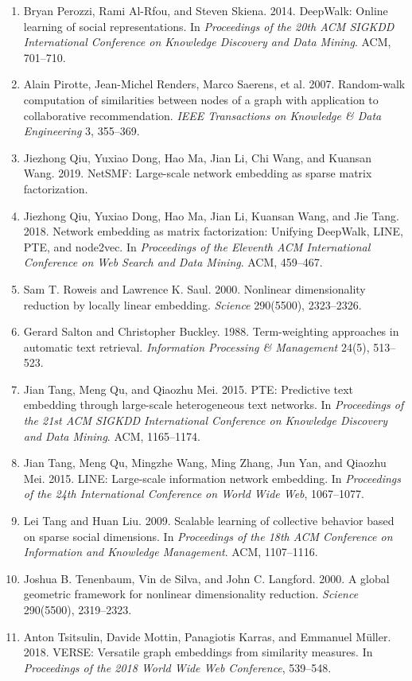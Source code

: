\documentclass[11pt]{article}
\begin{document}
\begin{enumerate}[leftmargin=1.5em]
    \item Bryan Perozzi, Rami Al-Rfou, and Steven Skiena. 2014. DeepWalk: Online learning of social representations. In \emph{Proceedings of the 20th ACM SIGKDD International Conference on Knowledge Discovery and Data Mining}. ACM, 701--710.
    \item Alain Pirotte, Jean-Michel Renders, Marco Saerens, et al. 2007. Random-walk computation of similarities between nodes of a graph with application to collaborative recommendation. \emph{IEEE Transactions on Knowledge \& Data Engineering} 3, 355--369.
    \item Jiezhong Qiu, Yuxiao Dong, Hao Ma, Jian Li, Chi Wang, and Kuansan Wang. 2019. NetSMF: Large-scale network embedding as sparse matrix factorization.
    \item Jiezhong Qiu, Yuxiao Dong, Hao Ma, Jian Li, Kuansan Wang, and Jie Tang. 2018. Network embedding as matrix factorization: Unifying DeepWalk, LINE, PTE, and node2vec. In \emph{Proceedings of the Eleventh ACM International Conference on Web Search and Data Mining}. ACM, 459--467.
    \item Sam T. Roweis and Lawrence K. Saul. 2000. Nonlinear dimensionality reduction by locally linear embedding. \emph{Science} 290(5500), 2323--2326.
    \item Gerard Salton and Christopher Buckley. 1988. Term-weighting approaches in automatic text retrieval. \emph{Information Processing \& Management} 24(5), 513--523.
    \item Jian Tang, Meng Qu, and Qiaozhu Mei. 2015. PTE: Predictive text embedding through large-scale heterogeneous text networks. In \emph{Proceedings of the 21st ACM SIGKDD International Conference on Knowledge Discovery and Data Mining}. ACM, 1165--1174.
    \item Jian Tang, Meng Qu, Mingzhe Wang, Ming Zhang, Jun Yan, and Qiaozhu Mei. 2015. LINE: Large-scale information network embedding. In \emph{Proceedings of the 24th International Conference on World Wide Web}, 1067--1077.
    \item Lei Tang and Huan Liu. 2009. Scalable learning of collective behavior based on sparse social dimensions. In \emph{Proceedings of the 18th ACM Conference on Information and Knowledge Management}. ACM, 1107--1116.
    \item Joshua B. Tenenbaum, Vin de Silva, and John C. Langford. 2000. A global geometric framework for nonlinear dimensionality reduction. \emph{Science} 290(5500), 2319--2323.
    \item Anton Tsitsulin, Davide Mottin, Panagiotis Karras, and Emmanuel M\"uller. 2018. VERSE: Versatile graph embeddings from similarity measures. In \emph{Proceedings of the 2018 World Wide Web Conference}, 539--548.

\end{enumerate}
\end{document}
